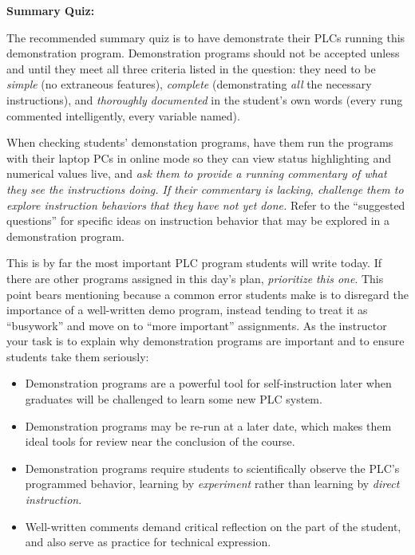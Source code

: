 \noindent
{\bf Summary Quiz:}

The recommended summary quiz is to have  demonstrate their PLCs running this demonstration program.  Demonstration programs should not be accepted unless and until they meet all three criteria listed in the question: they need to be {\it simple} (no extraneous features), {\it complete} (demonstrating {\it all} the necessary instructions), and {\it thoroughly documented} in the student's own words (every rung commented intelligently, every variable named).

\vskip 10pt

When checking students' demonstation programs, have them run the programs with their laptop PCs in online mode so they can view status highlighting and numerical values live, and {\it ask them to provide a running commentary of what they see the instructions doing.  If their commentary is lacking, challenge them to explore instruction behaviors that they have not yet done.}  Refer to the ``suggested questions'' for specific ideas on instruction behavior that may be explored in a demonstration program.

\vskip 10pt

This is by far the most important PLC program students will write today.  If there are other programs assigned in this day's plan, {\it prioritize this one}.  This point bears mentioning because a common error students make is to disregard the importance of a well-written demo program, instead tending to treat it as ``busywork'' and move on to ``more important'' assignments.  As the instructor your task is to explain why demonstration programs are important and to ensure students take them seriously:

\begin{itemize}
\item{} Demonstration programs are a powerful tool for self-instruction later when graduates will be challenged to learn some new PLC system.
\vskip 5pt
\item{} Demonstration programs may be re-run at a later date, which makes them ideal tools for review near the conclusion of the course.
\vskip 5pt
\item{} Demonstration programs require students to scientifically observe the PLC's programmed behavior, learning by {\it experiment} rather than learning by {\it direct instruction}.
\vskip 5pt
\item{} Well-written comments demand critical reflection on the part of the student, and also serve as practice for technical expression.
\end{itemize}








